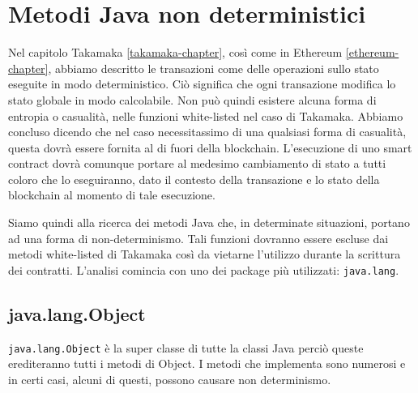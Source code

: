 
\chapter{Metodi Java non deterministici}
\label{metodi-java-non-deterministici}
	Nel capitolo Takamaka \ref{takamaka-chapter}, così come in Ethereum \ref{ethereum-chapter}, abbiamo descritto le transazioni come delle operazioni sullo stato eseguite in modo deterministico. Ciò significa che ogni transazione modifica lo stato globale in modo calcolabile. Non può quindi esistere alcuna forma di entropia o casualità, nelle funzioni white-listed nel caso di Takamaka. Abbiamo concluso dicendo che nel caso necessitassimo di una qualsiasi forma di casualità, questa dovrà essere fornita al di fuori della blockchain. L'esecuzione di uno smart contract dovrà comunque portare al medesimo cambiamento di stato a tutti coloro che lo eseguiranno, dato il contesto della transazione e lo stato della blockchain al momento di tale esecuzione. 

	Siamo quindi alla ricerca dei metodi Java che, in determinate situazioni, portano ad una forma di non-determinismo. Tali funzioni dovranno essere escluse dai metodi white-listed di Takamaka così da vietarne l'utilizzo durante la scrittura dei contratti. L'analisi comincia con uno dei package più utilizzati: \lstinline|java.lang|.

	\section{java.lang.Object}
		\lstinline|java.lang.Object| è la super classe di tutte la classi Java perciò queste erediteranno tutti i metodi di Object. I metodi che implementa sono numerosi e in certi casi, alcuni di questi, possono causare non determinismo.

